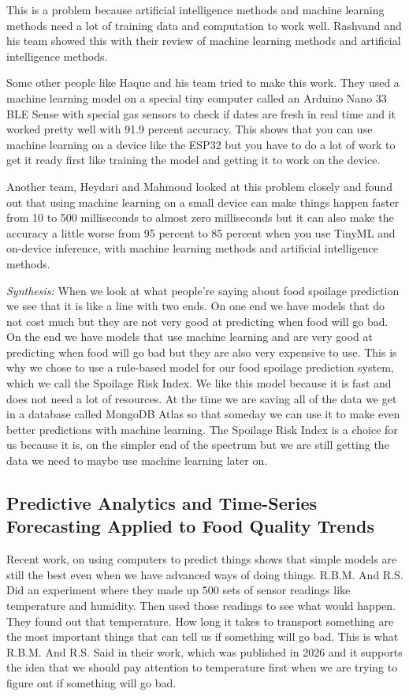 \documentclass[conference]{IEEEtran}
\begin{document}
This is a problem because artificial intelligence methods and machine learning methods need a lot of training data and computation to work well. Rashvand and his team showed this with their review of machine learning methods and artificial intelligence methods.

Some other people like Haque and his team tried to make this work. They used a machine learning model on a special tiny computer called an Arduino Nano 33 BLE Sense with special gas sensors to check if dates are fresh in real time and it worked pretty well with 91.9 percent accuracy\cite{haque2025}. This shows that you can use machine learning on a device like the ESP32 but you have to do a lot of work to get it ready first like training the model and getting it to work on the device.

Another team, Heydari and Mahmoud looked at this problem closely and found out that using machine learning on a small device can make things happen faster from 10 to 500 milliseconds to almost zero milliseconds but it can also make the accuracy a little worse from 95 percent to 85 percent\cite{heydari2025} when you use TinyML and on-device inference, with machine learning methods and artificial intelligence methods.

\textit{Synthesis:} When we look at what people're saying about food spoilage prediction we see that it is like a line with two ends. On one end we have models that do not cost much but they are not very good at predicting when food will go bad. On the end we have models that use machine learning and are very good at predicting when food will go bad but they are also very expensive to use. This is why we chose to use a rule-based model for our food spoilage prediction system, which we call the Spoilage Risk Index. We like this model because it is fast and does not need a lot of resources. At the time we are saving all of the data we get in a database called MongoDB Atlas so that someday we can use it to make even better predictions with machine learning. The Spoilage Risk Index is a choice for us because it is, on the simpler end of the spectrum but we are still getting the data we need to maybe use machine learning later on.

\subsection{Predictive Analytics and Time-Series Forecasting Applied to Food Quality Trends}

Recent work, on using computers to predict things shows that simple models are still the best even when we have advanced ways of doing things. R.B.M. And R.S. Did an experiment where they made up 500 sets of sensor readings like temperature and humidity. Then used those readings to see what would happen.\cite{rbm2026} They found out that temperature. How long it takes to transport something are the most important things that can tell us if something will go bad. This is what R.B.M. And R.S. Said in their work, which was published in 2026 and it supports the idea that we should pay attention to temperature first when we are trying to figure out if something will go bad.
\end{document}
